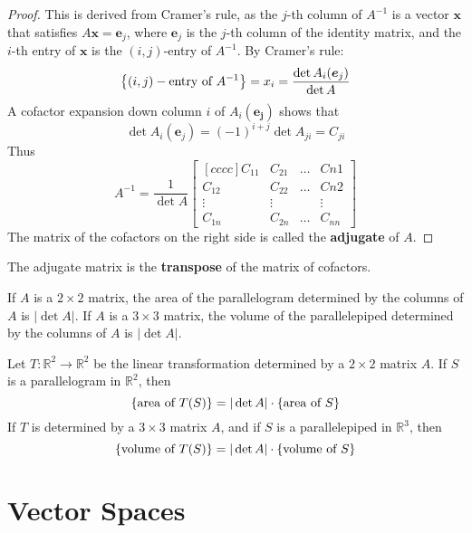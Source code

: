 \documentclass[11pt]{scrartcl}
\theoremstyle{dotlessP}
\theoremstyle{dotlessN}
\DeclarePairedDelimiter\set{\{}{\}}
\newcommand{\reals}{\mathbb{R}} %
\begin{document}
\begin{proof}
	This is derived from Cramer's rule, as the $j$-th column of $A^{-1}$ is a vector $\bm{x}$ that satisfies $A\bm{x} = \bm{e}_j$, where  $\bm{e}_j$ is the $j$-th column of the identity matrix, and the $i$-th entry of $\bm{x}$ is the $(i,j)$-entry of $A^{-1}$. By Cramer's rule:
	\[
		\set*{(i,j)-\text{entry of }A^{-1}} = x_i = \frac{\det A_i(\bm{e}_j)}{\det A}
	\] 
	A cofactor expansion down column $i$ of $A_i(\bm{e_j})$ shows that
	\[
		\det A_i (\bm{e}_j) = (-1)^{i + j}\det A_{ji} = C_{ji}
	\] 
	Thus
	\[
		A^{-1} = \frac{1}{\det A}
		\begin{bmatrix}[cccc]
			C_{11} & C_{21} & \dots & C{n1} \\
			C_{12} & C_{22} & \dots & C{n2} \\
			\vdots & \vdots & & \vdots \\
			C_{1n} & C_{2n} & \dots & C_{nn}
		\end{bmatrix}
	\] 
	The matrix of the cofactors on the right side is called the \textbf{adjugate} of $A$.
\end{proof}
\begin{remark}
	The adjugate matrix is the \textbf{transpose} of the matrix of cofactors.
\end{remark}
\begin{theorem}
	If $A$ is a $2 \times 2$ matrix, the area of the parallelogram determined by the columns of $A$ is $|\det A|$. If $A$ is a $3 \times 3$ matrix, the volume of the parallelepiped determined by the columns of $A$ is $|\det A|$.
\end{theorem}
\begin{theorem}
	Let $T: \reals^2 \to \reals^2$ be the linear transformation determined by a $2 \times 2$ matrix $A$. If $S$ is a parallelogram in $\reals^2$, then
	\[
		\set*{\text{area of }T(S)} = |\det A| \cdot \set*{\text{area of } S}
	\] 
	If $T$ is determined by a $3 \times 3$ matrix $A$, and if $S$ is a parallelepiped in $\reals^3$, then
	\[
		\set*{\text{volume of }T(S)} = |\det A| \cdot \set*{\text{volume of } S}
	\] 
\end{theorem}
\section{Vector Spaces}
\end{document}
